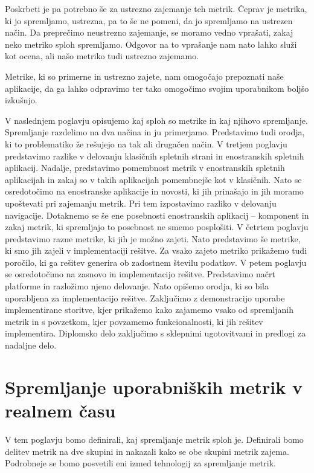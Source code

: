 \documentclass[a4paper, 12pt]{book}
\begin{document}
Poskrbeti je pa potrebno še za ustrezno zajemanje teh metrik. Čeprav je metrika, ki jo spremljamo, ustrezna, pa to še ne pomeni, da jo spremljamo na ustrezen način. Da preprečimo neustrezno zajemanje, se moramo vedno vprašati, zakaj neko metriko sploh spremljamo. Odgovor na to vprašanje nam nato lahko služi kot ocena, ali našo metriko tudi ustrezno zajemamo.

Metrike, ki so primerne in ustrezno zajete, nam omogočajo prepoznati  naše aplikacije, da ga lahko odpravimo ter tako omogočimo svojim uporabnikom boljšo izkušnjo.

V naslednjem poglavju opisujemo kaj sploh so metrike in kaj njihovo spremljanje. Spremljanje razdelimo na dva načina in ju primerjamo. Predstavimo tudi orodja, ki to problematiko že rešujejo na tak ali drugačen način. V tretjem poglavju predstavimo razlike v delovanju klasičnih spletnih strani in enostranskih spletnih aplikacij. Nadalje, predstavimo pomembnost metrik v enostranskih spletnih aplikacijah in zakaj so v takih aplikacijah pomembnejše kot v klasičnih. Nato se osredotočimo na enostranske aplikacije in novosti, ki jih prinašajo in jih moramo upoštevati pri zajemanju metrik. Pri tem izpostavimo razliko v delovanju navigacije. Dotaknemo se še ene posebnosti enostranskih aplikacij -- komponent in zakaj metrik, ki spremljajo to posebnost ne smemo posplošiti. V četrtem poglavju predstavimo razne metrike, ki jih je možno zajeti. Nato predstavimo še metrike, ki smo jih zajeli v implementaciji rešitve. Za vsako zajeto metriko prikažemo tudi poročilo, ki ga rešitev generira ob zadostnem številu podatkov. V petem poglavju se osredotočimo na zasnovo in implementacijo rešitve. Predstavimo načrt platforme in razložimo njeno delovanje. Nato opišemo orodja, ki so bila uporabljena za implementacijo rešitve. Zaključimo z demonstracijo uporabe implementirane storitve, kjer prikažemo kako zajamemo vsako od spremljanih metrik in s povzetkom, kjer povzamemo funkcionalnosti, ki jih rešitev implementira. Diplomsko delo zaključimo s sklepnimi ugotovitvami in predlogi za nadaljne delo.

\chapter{Spremljanje uporabniških metrik v realnem času}
\label{ch0}
V tem poglavju bomo definirali, kaj spremljanje metrik sploh je. Definirali bomo delitev metrik na dve skupini in nakazali kako se obe skupini metrik zajema. Podrobneje se bomo posvetili eni izmed tehnologij za spremljanje metrik.
\end{document}

